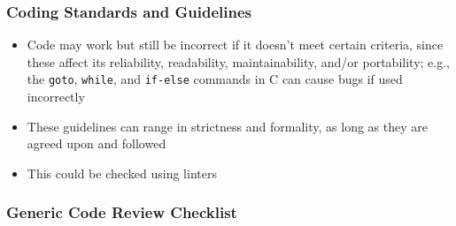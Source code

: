 \subsubsection{Coding Standards and Guidelines \cite[p.~96-99]{patton_software_2006}}

\begin{itemize}
      \item Code may work but still be incorrect if it doesn't meet certain
            criteria, since these affect its reliability, readability,
            maintainability, and/or portability; e.g., the \texttt{goto},
            \texttt{while}, and \texttt{if-else} commands in C can cause bugs
            if used incorrectly \cite[p.~96]{patton_software_2006}
      \item These guidelines can range in strictness and formality, as long as
            they are agreed upon and followed \cite[p.~96]{patton_software_2006}
      \item This could be checked using linters
\end{itemize}

\subsubsection{Generic Code Review Checklist \cite[p.~99-103]{patton_software_2006}}
\label{gen-code-review-checklist}

